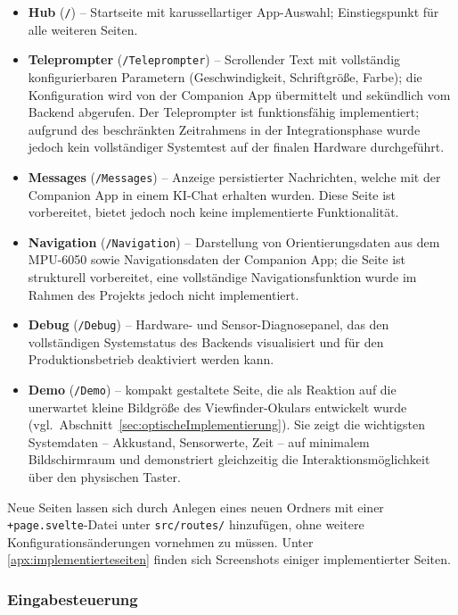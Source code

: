 \begin{itemize}
  \item \textbf{Hub} (\texttt{/}) -- Startseite mit karussellartiger
    App-Auswahl; Einstiegspunkt für alle weiteren Seiten.
  \item \textbf{Teleprompter} (\texttt{/Teleprompter}) -- Scrollender Text
    mit vollständig konfigurierbaren Parametern (Geschwindigkeit, Schriftgröße,
    Farbe); die Konfiguration wird von der Companion App übermittelt und
    sekündlich vom Backend abgerufen.
    Der Teleprompter ist funktionsfähig implementiert; aufgrund des
    beschränkten Zeitrahmens in der Integrationsphase wurde jedoch kein
    vollständiger Systemtest auf der finalen Hardware durchgeführt.
  \item \textbf{Messages} (\texttt{/Messages}) -- Anzeige persistierter Nachrichten, welche
    mit der Companion App in einem KI-Chat erhalten wurden. Diese Seite ist vorbereitet, bietet jedoch noch keine implementierte Funktionalität.
  \item \textbf{Navigation} (\texttt{/Navigation}) -- Darstellung von
    Orientierungsdaten aus dem MPU-6050 sowie Navigationsdaten der Companion App; die Seite ist strukturell vorbereitet, eine vollständige Navigationsfunktion wurde im Rahmen
    des Projekts jedoch nicht implementiert.
  \item \textbf{Debug} (\texttt{/Debug}) -- Hardware- und Sensor-Diagnosepanel,
    das den vollständigen Systemstatus des Backends visualisiert und für den
    Produktionsbetrieb deaktiviert werden kann.
  \item \textbf{Demo} (\texttt{/Demo}) -- kompakt gestaltete Seite, die als
    Reaktion auf die unerwartet kleine Bildgröße des Viewfinder-Okulars
    entwickelt wurde (vgl.~Abschnitt~\ref{sec:optischeImplementierung}).
    Sie zeigt die wichtigsten Systemdaten -- Akkustand, Sensorwerte,
    Zeit -- auf minimalem Bildschirmraum und demonstriert gleichzeitig
    die Interaktionsmöglichkeit über den physischen Taster.
    \label{subsec:demoSeite}
\end{itemize}

Neue Seiten lassen sich durch Anlegen eines neuen Ordners mit einer
\texttt{+page.svelte}-Datei unter \texttt{src/routes/} hinzufügen, ohne
weitere Konfigurationsänderungen vornehmen zu müssen. Unter \ref{apx:implementierteseiten} finden sich Screenshots einiger implementierter Seiten.

\subsubsection{Eingabesteuerung}
\label{subsubsec:inputController}

